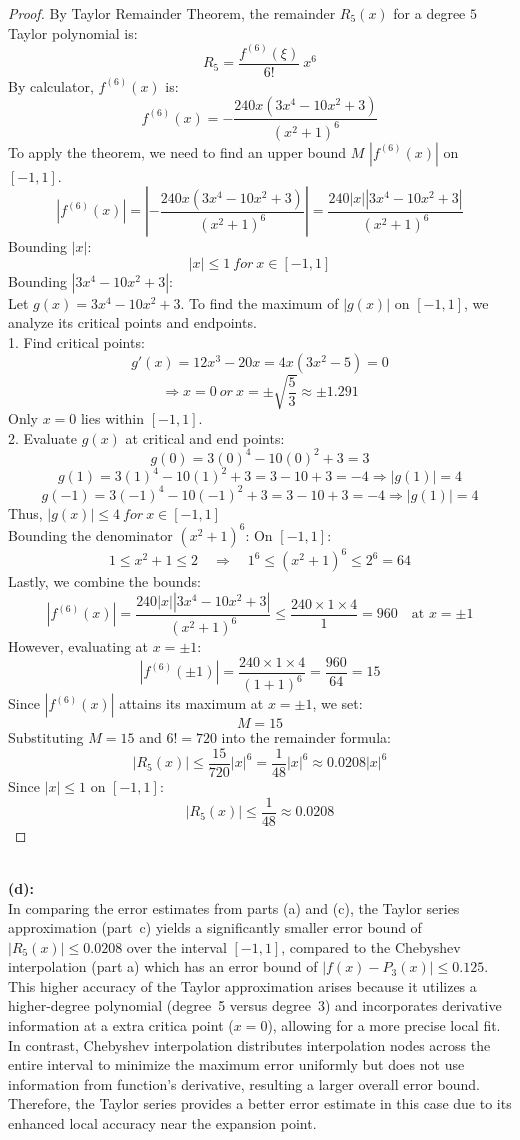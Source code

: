 \documentclass{article}
\begin{document}
\begin{proof}
By Taylor Remainder Theorem, the remainder $R_{5}(x)$ for a degree $5$ Taylor polynomial is:
\[ R_5 = \frac{f^{(6)}(\xi)}{6!} \ x^6 \]
By calculator, $f^{(6)}(x)$ is:
\[ f^{(6)}(x) = -\frac{240x(3x^4 -10x^2 + 3)}{(x^2 + 1)^6} \]
To apply the theorem, we need to find an upper bound $M$ $|f^{(6)}(x)|$ on $[-1, 1]$.
\[ |f^{(6)}(x)| = \left|-\frac{240x(3x^4 -10x^2 + 3)}{(x^2 + 1)^6} \right| = \frac{240|x||3x^4 -10x^2 + 3|}{(x^2 + 1)^6} \]
Bounding $|x|$: 
\[ |x| \leq 1 \ for \ x \in [-1, 1] \]
Bounding $|3x^4 -10x^2 + 3|$: 
\\
Let $g(x) = 3x^4 - 10x^2 + 3$. To find the maximum of $|g(x)|$ on $[-1,1]$, we analyze its critical points and endpoints.
\\
1. Find critical points:
\[ g'(x) = 12x^3 - 20x = 4x(3x^2 - 5) = 0 \]
\[ \Rightarrow x = 0 \ or \ x = \pm \sqrt{\frac{5}{3}} \approx \pm 1.291 \]
Only $x = 0$ lies within $[-1, 1]$.
\\
2. Evaluate $g(x)$ at critical and end points:
\[ g(0) = 3(0)^4 - 10(0)^2 + 3 = 3 \]
\[ g(1) = 3(1)^4 - 10(1)^2 + 3 = 3 - 10 + 3 = -4 \Rightarrow |g(1)| = 4 \]
\[ g(-1) = 3(-1)^4 - 10(-1)^2 + 3 = 3 - 10 + 3 = -4 \Rightarrow |g(1)| = 4 \]
Thus, \( |g(x)| \leq 4 \ for \ x \in [-1, 1] \)
\\
Bounding the denominator $(x^2 + 1)^6$:
On \([-1,1]\):
\[
1 \leq x^2 + 1 \leq 2 \quad \Rightarrow \quad 1^6 \leq (x^2 + 1)^6 \leq 2^6 = 64
\]
Lastly, we combine the bounds:
\[
|f^{(6)}(x)| = \frac{240|x||3x^4 -10x^2 + 3|}{(x^2 + 1)^6} \leq \frac{240 \times 1 \times 4}{1} = 960 \quad \text{at } x = \pm1
\]
However, evaluating at \( x = \pm1 \):
\[
|f^{(6)}(\pm1)| = \frac{240 \times 1 \times 4}{(1 + 1)^6} = \frac{960}{64} = 15
\]
Since \( |f^{(6)}(x)| \) attains its maximum at \( x = \pm1 \), we set:
\[
M = 15
\]
Substituting \( M = 15 \) and \( 6! = 720 \) into the remainder formula:
\[
|R_5(x)| \leq \frac{15}{720} |x|^6 = \frac{1}{48} |x|^6 \approx 0.0208 |x|^6
\]
Since \( |x| \leq 1 \) on \([-1,1]\):
\[
    |R_5(x)| \leq \frac{1}{48} \approx 0.0208
\]
\end{proof}
\\
\textbf{(d): }
\\
In comparing the error estimates from parts (a) and (c), the Taylor series approximation (part~c) yields a significantly smaller error bound of \( |R_5(x)| \leq 0.0208 \) over the interval \([-1, 1]\), 
compared to the Chebyshev interpolation (part a) which has an error bound of \( |f(x) - P_3(x)| \leq 0.125 \). 
This higher accuracy of the Taylor approximation arises because it utilizes a higher-degree polynomial (degree~5 versus degree~3) and incorporates derivative information at a extra critica point (\(x=0\)), allowing for a more precise local fit. 
In contrast, Chebyshev interpolation distributes interpolation nodes across the entire interval to minimize the maximum error uniformly but does not use information from function's derivative, resulting a larger overall error bound. 
Therefore, the Taylor series provides a better error estimate in this case due to its enhanced local accuracy near the expansion point.
\end{document}
